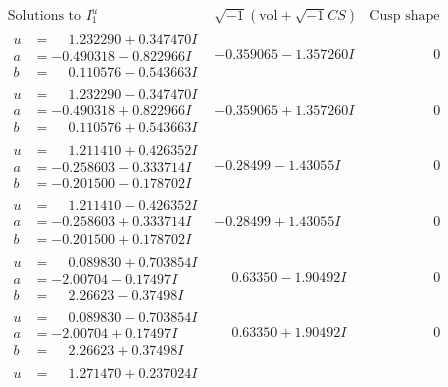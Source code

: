 \documentclass[1p]{elsarticle_modified}
\theoremstyle{definition}
\newcommand{\I}{\sqrt{-1}}
\begin{document}
$$\begin{array}{c|c|c}
\text{Solutions to }I^u_{1}& \I (\text{vol} + \sqrt{-1}CS) & \text{Cusp shape}\\
 \hline 
\begin{aligned}
u &= \phantom{-}1.232290 + 0.347470 I \\
a &= -0.490318 - 0.822966 I \\
b &= \phantom{-}0.110576 - 0.543663 I\end{aligned}
 & -0.359065 - 1.357260 I & \phantom{-0.000000 } 0 \\ \hline\begin{aligned}
u &= \phantom{-}1.232290 - 0.347470 I \\
a &= -0.490318 + 0.822966 I \\
b &= \phantom{-}0.110576 + 0.543663 I\end{aligned}
 & -0.359065 + 1.357260 I & \phantom{-0.000000 } 0 \\ \hline\begin{aligned}
u &= \phantom{-}1.211410 + 0.426352 I \\
a &= -0.258603 - 0.333714 I \\
b &= -0.201500 - 0.178702 I\end{aligned}
 & -0.28499 - 1.43055 I & \phantom{-0.000000 } 0 \\ \hline\begin{aligned}
u &= \phantom{-}1.211410 - 0.426352 I \\
a &= -0.258603 + 0.333714 I \\
b &= -0.201500 + 0.178702 I\end{aligned}
 & -0.28499 + 1.43055 I & \phantom{-0.000000 } 0 \\ \hline\begin{aligned}
u &= \phantom{-}0.089830 + 0.703854 I \\
a &= -2.00704 - 0.17497 I \\
b &= \phantom{-}2.26623 - 0.37498 I\end{aligned}
 & \phantom{-}0.63350 - 1.90492 I & \phantom{-0.000000 } 0 \\ \hline\begin{aligned}
u &= \phantom{-}0.089830 - 0.703854 I \\
a &= -2.00704 + 0.17497 I \\
b &= \phantom{-}2.26623 + 0.37498 I\end{aligned}
 & \phantom{-}0.63350 + 1.90492 I & \phantom{-0.000000 } 0 \\ \hline\begin{aligned}
u &= \phantom{-}1.271470 + 0.237024 I \\

\end{aligned}
\end{array}$$
\end{document}
